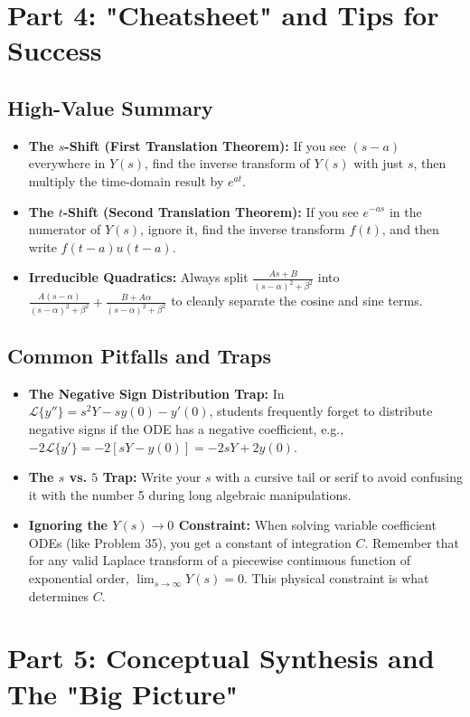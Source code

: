 \documentclass[11pt, letterpaper]{article}
\theoremstyle{definition}
\theoremstyle{remark}
\newcommand{\Lap}{\mathcal{L}}
\begin{document}
\section{Part 4: "Cheatsheet" and Tips for Success}

\subsection{High-Value Summary}
\begin{itemize}
    \item \textbf{The $s$-Shift (First Translation Theorem):} If you see $(s-a)$ everywhere in $Y(s)$, find the inverse transform of $Y(s)$ with just $s$, then multiply the time-domain result by $e^{at}$.
    \item \textbf{The $t$-Shift (Second Translation Theorem):} If you see $e^{-as}$ in the numerator of $Y(s)$, ignore it, find the inverse transform $f(t)$, and then write $f(t-a)u(t-a)$.
    \item \textbf{Irreducible Quadratics:} Always split $\frac{As + B}{(s-\alpha)^2 + \beta^2}$ into $\frac{A(s-\alpha)}{(s-\alpha)^2 + \beta^2} + \frac{B + A\alpha}{(s-\alpha)^2 + \beta^2}$ to cleanly separate the cosine and sine terms.
\end{itemize}

\subsection{Common Pitfalls and Traps}
\begin{itemize}
    \item \textbf{The Negative Sign Distribution Trap:} In $\Lap\{y''\} = s^2 Y - sy(0) - y'(0)$, students frequently forget to distribute negative signs if the ODE has a negative coefficient, e.g., $-2\Lap\{y'\} = -2[sY - y(0)] = -2sY + 2y(0)$.
    \item \textbf{The $s$ vs. $5$ Trap:} Write your $s$ with a cursive tail or serif to avoid confusing it with the number 5 during long algebraic manipulations.
    \item \textbf{Ignoring the $Y(s) \to 0$ Constraint:} When solving variable coefficient ODEs (like Problem 35), you get a constant of integration $C$. Remember that for any valid Laplace transform of a piecewise continuous function of exponential order, $\lim_{s \to \infty} Y(s) = 0$. This physical constraint is what determines $C$.
\end{itemize}

\section{Part 5: Conceptual Synthesis and The "Big Picture"}
\end{document}
